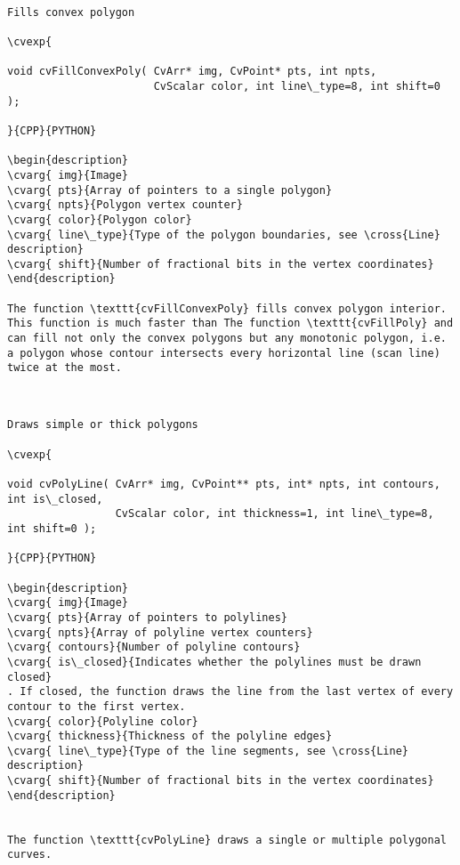 \begin{verbatim}

Fills convex polygon

\cvexp{

void cvFillConvexPoly( CvArr* img, CvPoint* pts, int npts,
                       CvScalar color, int line\_type=8, int shift=0 );

}{CPP}{PYTHON}

\begin{description}
\cvarg{ img}{Image}
\cvarg{ pts}{Array of pointers to a single polygon}
\cvarg{ npts}{Polygon vertex counter}
\cvarg{ color}{Polygon color}
\cvarg{ line\_type}{Type of the polygon boundaries, see \cross{Line} description}
\cvarg{ shift}{Number of fractional bits in the vertex coordinates}
\end{description}

The function \texttt{cvFillConvexPoly} fills convex polygon interior. This function is much faster than The function \texttt{cvFillPoly} and can fill not only the convex polygons but any monotonic polygon, i.e. a polygon whose contour intersects every horizontal line (scan line) twice at the most.


\end{verbatim}
\begin{verbatim}

Draws simple or thick polygons

\cvexp{

void cvPolyLine( CvArr* img, CvPoint** pts, int* npts, int contours, int is\_closed,
                 CvScalar color, int thickness=1, int line\_type=8, int shift=0 );

}{CPP}{PYTHON}

\begin{description}
\cvarg{ img}{Image}
\cvarg{ pts}{Array of pointers to polylines}
\cvarg{ npts}{Array of polyline vertex counters}
\cvarg{ contours}{Number of polyline contours}
\cvarg{ is\_closed}{Indicates whether the polylines must be drawn closed}
. If closed, the function draws the line from the last vertex of every contour to the first vertex.
\cvarg{ color}{Polyline color}
\cvarg{ thickness}{Thickness of the polyline edges}
\cvarg{ line\_type}{Type of the line segments, see \cross{Line} description}
\cvarg{ shift}{Number of fractional bits in the vertex coordinates}
\end{description}


The function \texttt{cvPolyLine} draws a single or multiple polygonal curves.


\end{verbatim}
